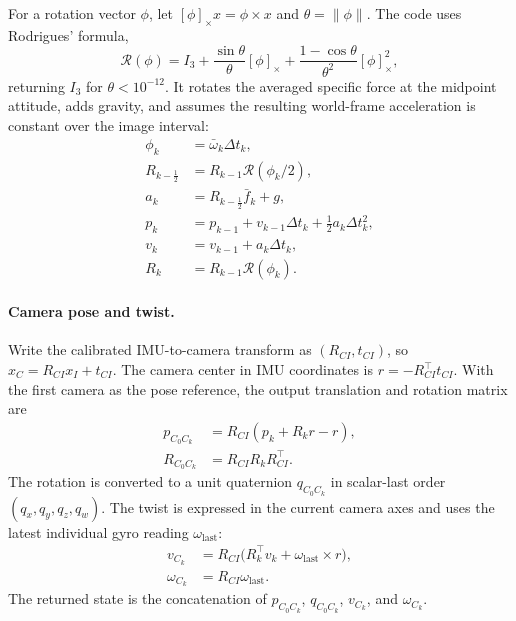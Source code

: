 For a rotation vector $\phi$, let $[\phi]_\times x=\phi\times x$ and
$\theta=\lVert\phi\rVert$. The code uses Rodrigues' formula,
\begin{equation}
    \mathcal R(\phi)
    = I_3+\frac{\sin\theta}{\theta}[\phi]_\times
      +\frac{1-\cos\theta}{\theta^2}[\phi]_\times^2 ,
\end{equation}
returning $I_3$ for $\theta<10^{-12}$. It rotates the averaged specific
force at the midpoint attitude, adds gravity, and assumes the resulting
world-frame acceleration is constant over the image interval:
\begin{align}
    \phi_k &= \bar\omega_k\Delta t_k,\\
    R_{k-\frac12} &= R_{k-1}\mathcal R(\phi_k/2),\\
    a_k &= R_{k-\frac12}\bar f_k + g,\\
    p_k &= p_{k-1}+v_{k-1}\Delta t_k+\tfrac12 a_k\Delta t_k^2,\\
    v_k &= v_{k-1}+a_k\Delta t_k,\\
    R_k &= R_{k-1}\mathcal R(\phi_k).
\end{align}

\paragraph{Camera pose and twist.}
Write the calibrated IMU-to-camera transform as
$(R_{CI},t_{CI})$, so $x_C=R_{CI}x_I+t_{CI}$. The camera center in IMU
coordinates is $r=-R_{CI}^\top t_{CI}$. With the first camera as the pose
reference, the output translation and rotation matrix are
\begin{align}
    p_{C_0 C_k} &= R_{CI}(p_k+R_k r-r),\\
    R_{C_0 C_k} &= R_{CI}R_kR_{CI}^\top .
\end{align}
The rotation is converted to a unit quaternion $q_{C_0 C_k}$
in scalar-last order $(q_x,q_y,q_z,q_w)$. The twist is expressed in the
current camera axes and uses the latest individual gyro reading
$\omega_{\mathrm{last}}$:
\begin{align}
    v_{C_k} &= R_{CI}\bigl(R_k^\top v_k
                   +\omega_{\mathrm{last}}\times r\bigr),\\
    \omega_{C_k} &= R_{CI}\omega_{\mathrm{last}} .
\end{align}
The returned state is the concatenation of $p_{C_0 C_k}$,
$q_{C_0 C_k}$, $v_{C_k}$, and $\omega_{C_k}$.
